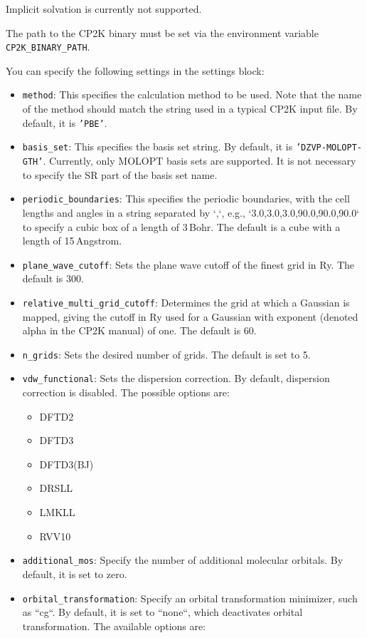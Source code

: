 \documentclass[]{tufte-book}
\begin{document}
Implicit solvation is currently not supported.

The path to the \textsc{CP2K} binary must be set via the environment variable \texttt{CP2K\_BINARY\_PATH}.

You can specify the following settings in the settings block:
\begin{itemize}
	\item \texttt{method}: This specifies the calculation method to be used.
	Note that the name of the method should match the string used in a typical \textsc{CP2K} input file.
	By default, it is \texttt{'PBE'}.
	\item \texttt{basis\_set}: This specifies the basis set string. By default, it is \texttt{'DZVP-MOLOPT-GTH'}. Currently, only MOLOPT basis sets are supported. It is not necessary to specify the SR part of the basis set name.
	\item \texttt{periodic\_boundaries}: This specifies the periodic boundaries, with the cell lengths and angles in a string separated by `,`, e.g., `3.0,3.0,3.0,90.0,90.0,90.0` to specify a cubic box of a length of 3\,Bohr. The default is a cube with a length of 15\,Angstrom.
	\item \texttt{plane\_wave\_cutoff}: Sets the plane wave cutoff of the finest grid in Ry. The default is 300.
	\item \texttt{relative\_multi\_grid\_cutoff}: Determines the grid at which a Gaussian is mapped, giving the cutoff in Ry used for a Gaussian with exponent (denoted alpha in the \textsc{CP2K} manual) of one. The default is 60.
	\item \texttt{n\_grids}: Sets the desired number of grids. The default is set to 5.
	\item \texttt{vdw\_functional}: Sets the dispersion correction. By default, dispersion correction is disabled. The possible options are:
        \begin{itemize}
 		\item DFTD2
 		\item DFTD3
 		\item DFTD3(BJ)
 		\item DRSLL
 		\item LMKLL
 		\item RVV10
        \end{itemize}
	\item \texttt{additional\_mos}: Specify the number of additional molecular orbitals. By default, it is set to zero.
	\item \texttt{orbital\_transformation}: Specify an orbital transformation minimizer, such as ``cg``. By default, it is set to ``none``, which deactivates orbital transformation. The available options are:

\end{itemize}
\end{document}
